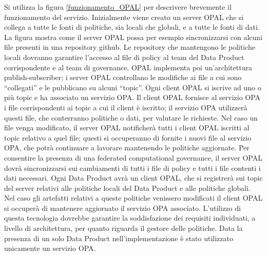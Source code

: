 \documentclass[12pt]{report}
\begin{document}
Si utilizza la figura \ref{funzionamento_OPAL} per descrivere brevemente il funzionamento del servizio.
Inizialmente viene creato un server OPAL che si collega a tutte le fonti di politiche, sia locali che globali, e a tutte le fonti di dati.
La figura mostra come il server OPAL possa per esempio sincronizzarsi con alcuni file presenti in una repository github.
Le repository che mantengono le politiche locali dovranno garantire l'accesso al file di policy al team del Data Product corrispondente e al team di governance.
OPAL implementa poi un'architettura publish-subscriber;
i server OPAL controllano le modifiche ai file a cui sono ``collegati'' e le pubblicano su alcuni ``topic''.
Ogni client OPAL si iscrive ad uno o più topic e ha associato un servizio OPA.
Il client OPAL fornisce al servizio OPA i file corrispondenti ai topic a cui il client è iscritto; il servizio OPA utilizzerà questi file, che conterranno politiche o dati, per valutare le richieste.
Nel caso un file venga modificato, il server OPAL notificherà tutti i client OPAL iscritti al topic relativo a quel file; questi si occuperanno di fornite i nuovi file al servizio OPA, che potrà continuare a lavorare mantenendo le politiche aggiornate.
Per consentire la presenza di una federated computational governance, il server OPAL dovrà sincronizzarsi sui cambiamenti di tutti i file di policy e tutti i file contenti i dati necessari.
Ogni Data Product avrà un client OPAL, che si registrerà sui topic del server relativi alle politiche locali del Data Product e alle politiche globali.
Nel caso gli artefatti relativi a queste politiche venissero modificati il client OPAL si occuperà di mantenere aggiornato il servizio OPA associato.
L'utilizzo di questa tecnologia dovrebbe garantire la soddisfazione dei requisiti individuati, a livello di architettura, per quanto riguarda il gestore delle politiche.
Data la presenza di un solo Data Product nell'implementazione è stato utilizzato unicamente un servizio OPA.
\end{document}
